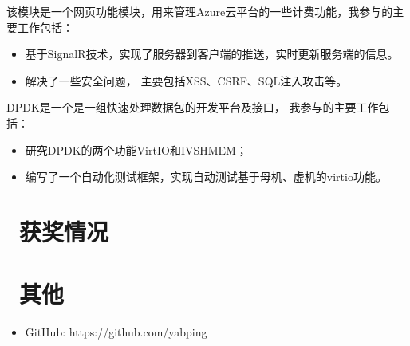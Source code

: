 \documentclass{resume}
\begin{document}
\begin{onehalfspacing}
该模块是一个网页功能模块，用来管理Azure云平台的一些计费功能，我参与的主要工作包括：
\begin{itemize}
  \item 基于SignalR技术，实现了服务器到客户端的推送，实时更新服务端的信息。
  \item 解决了一些安全问题， 主要包括XSS、CSRF、SQL注入攻击等。
\end{itemize}
\end{onehalfspacing}

\begin{onehalfspacing}
DPDK是一个是一组快速处理数据包的开发平台及接口， 我参与的主要工作包括：
\begin{itemize}
  \item 研究DPDK的两个功能VirtIO和IVSHMEM；
  \item 编写了一个自动化测试框架，实现自动测试基于母机、虚机的virtio功能。
\end{itemize}
\end{onehalfspacing}


\section{\faHeartO\ 获奖情况}

\section{\faInfo\ 其他}
\begin{itemize}[parsep=0.5ex]
  \item GitHub: https://github.com/yabping
\end{itemize}

%
%
\end{document}

